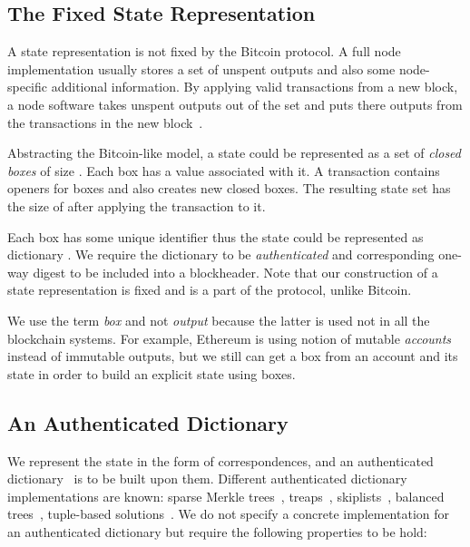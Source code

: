\documentclass[conference,compsoc]{IEEEtran}
\begin{document}
\subsection{The Fixed State Representation}
\label{fixed_rep}

A state representation is not fixed by the Bitcoin protocol. A full node implementation usually stores a set of unspent outputs and also some node-specific additional information. By applying valid transactions from a new block, a node software takes unspent outputs out of the set and puts there outputs from the transactions in the new block~\cite{Nakamoto2008}. 

Abstracting the Bitcoin-like model, a state could be represented as a set of \textit{closed boxes} of size . Each box has a value associated with it. A transaction contains openers for  boxes and also creates  new closed boxes. The resulting state set has the size of  after applying the transaction to it. 

Each box has some unique identifier  thus the state could be represented as dictionary . We require the dictionary to be \textit{authenticated} and corresponding one-way digest to be included into a blockheader. Note that our construction of a state representation is fixed and is a part of the protocol, unlike Bitcoin.

We use the term \textit{box} and not \textit{output} because the latter is used not in all the blockchain systems. For example, Ethereum\cite{ethyp} is using notion of mutable \textit{accounts} instead of immutable outputs, but we still can get a box from an account and its state in order to build an explicit state using boxes.

\subsection{An Authenticated Dictionary}

We represent the state in the form of  correspondences, and an authenticated dictionary~\cite{nissim1998certificate, kocher1998certificate} is to be built upon them. Different authenticated dictionary implementations are known: sparse Merkle trees~\cite{sparsemerkle}, treaps~\cite{crosby2011authenticated}, skiplists~\cite{anagnostopoulos2001persistent}, balanced trees~\cite{nissim1998certificate}, tuple-based solutions~\cite{crosby2011authenticated}. We do not specify a concrete implementation for an authenticated dictionary but require the following properties to be hold:
\end{document}
